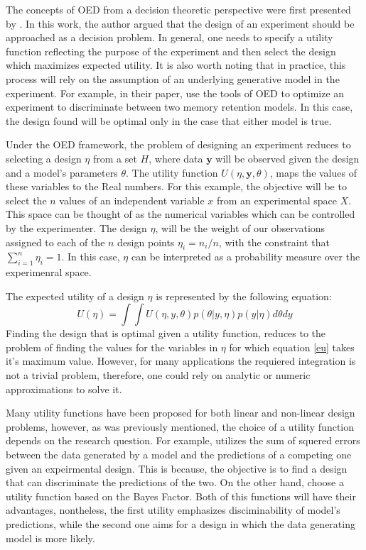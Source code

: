 \documentclass[preprint,review,12pt]{elsarticle}
\begin{document}
The concepts of OED from a decision theoretic perspective were first presented by \citet{Lindley1972}. In this work, the author argued that the design of an experiment should be approached as a decision problem. In general, one needs to specify a utility function reflecting the purpose of the experiment and then select the design which maximizes expected utility. It is also worth noting that in practice, this process will rely on the assumption of an underlying generative model in the experiment. For example, in their paper, \citet{Myung2009} use the tools of OED to optimize an experiment to discriminate between two memory retention models. In this case, the design found will be optimal only in the case that either model is true.

Under the OED framework, the problem of designing an experiment reduces to selecting a design $\eta$ from a set $H$, where data $\mathbf{y}$ will be observed given the design and a model's parameters $\theta$. The utility function $U(\eta,\mathbf{y},\theta)$, maps the values of these variables to the Real numbers. For this example, the objective will be to select the $n$ values of an independent variable $x$ from an experimental space $X$. This space can be thought of as the numerical variables which can be controlled by the experimenter. The design $\eta$, will be the weight of our observations assigned to each of the $n$ design points $\eta_i=n_i/n$, with the constraint that  $\sum_{i=1}^{n}\eta_i = 1$. In this case, $\eta$ can be interpreted as a probability measure over the experimenral space.

The expected utility of a design $\eta$ is represented by the following equation:
\begin{equation}
U(\eta)=\int \int U(\eta,y,\theta)p(\theta|y,\eta)p(y|\eta) d\theta dy
\label{eu}
\end{equation}
Finding the design that is optimal given a utility function, reduces to the problem of finding the values for the variables in $\eta$ for which equation \ref{eu} takes it's maximum value. However, for many applications the requiered integration is not a trivial problem, therefore, one could rely on analytic or numeric approximations to solve it.


Many utility functions have been proposed for both linear and non-linear design problems, however, as was previously mentioned, the choice of a utility function depends on the research question. For example, \cite{Myung2009} utilizes the sum of squered errors between the data generated by a model and the predictions of a competing one given an expeirmental design. This is because, the objective is to find a design that can discriminate the predictions of the two. On the other hand, \cite{ZL2010} choose a utility function based on the Bayes Factor. Both of this functions will have their advantages, nontheless, the first utility emphasizes disciminability of model's predictions, while the second one aims for a design in which the data generating model is more likely.
\end{document}
